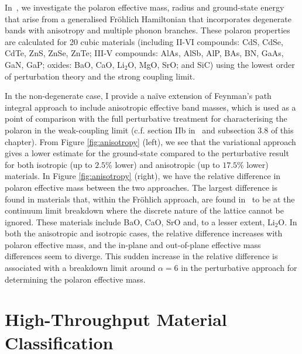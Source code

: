 In~\cite{guster_frohlich_2021}, we investigate the polaron effective mass, radius and ground-state energy that arise from a generalised Fr\"ohlich Hamiltonian that incorporates degenerate bands with anisotropy and multiple phonon branches. These polaron properties are calculated for 20 cubic materials (including II-VI compounds: CdS, CdSe, CdTe, ZnS, ZnSe, ZnTe; III-V compounds: AlAs, AlSb, AlP, BAs, BN, GaAs, GaN, GaP; oxides: BaO, CaO, Li$_2$O, MgO, SrO; and SiC) using the lowest order of perturbation theory and the strong coupling limit. \newline

In the non-degenerate case, I provide a na\"ive extension of Feynman's path integral approach to include anisotropic effective band masses, which is used as a point of comparison with the full perturbative treatment for characterising the polaron in the weak-coupling limit (c.f. section IIb in~\cite{guster_frohlich_2021} and subsection 3.8 of this chapter). From Figure \ref{fig:anisotropy} (left), we see that the variational approach gives a lower estimate for the ground-state compared to the perturbative result for both isotropic (up to $2.5$\% lower) and anisotropic (up to $17.5$\% lower) materials. In Figure \ref{fig:anisotropy} (right), we have the relative difference in polaron effective mass between the two approaches. The largest difference is found in materials that, within the Fr\"ohlich approach, are found in~\cite{guster_frohlich_2021} to be at the continuum limit breakdown where the discrete nature of the lattice cannot be ignored. These materials include BaO, CaO, SrO and, to a lesser extent, Li$_2$O. In both the anisotropic and isotropic cases, the relative difference increases with polaron effective mass, and the in-plane and out-of-plane effective mass differences seem to diverge. This sudden increase in the relative difference is associated with a breakdown limit around $\alpha = 6$ in the perturbative approach for determining the polaron effective mass.

\section{High-Throughput Material Classification}
\label{sec:chap-sixth-fourth}